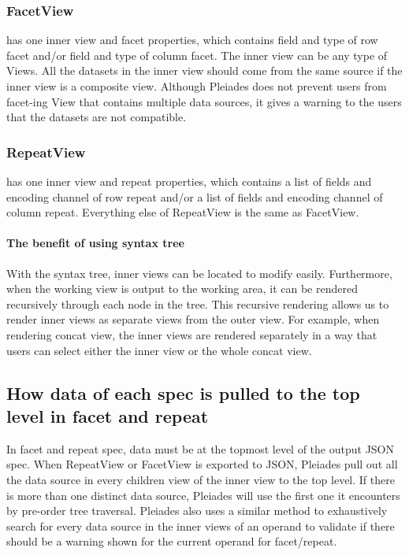 \documentclass[journal]{vgtc}                %
\begin{document}
\subsubsection{FacetView} has one inner view and facet properties, which contains
field and type of row facet and/or field and type of column facet. The inner
view can be any type of Views. All the datasets in the inner view should come
from the same source if the inner view is a composite view. Although Pleiades
does not prevent users from facet-ing View that contains multiple data sources,
it gives a warning to the users that the datasets are not compatible.

\subsubsection{RepeatView} has one inner view and repeat properties, which contains
a list of fields and encoding channel of row repeat and/or a list of fields and
encoding channel of column repeat. Everything else of RepeatView is the same as
FacetView.

\paragraph{The benefit of using syntax tree} With the syntax tree, inner views
can be located to modify easily. Furthermore, when the working view is output to
the working area, it can be rendered recursively through each node in the tree.
This recursive rendering allows us to render inner views as separate views from
the outer view. For example, when rendering concat view, the inner views are
rendered separately in a way that users can select either the inner view or
the whole concat view.

\subsection{How data of each spec is pulled to the top level in facet and repeat}
In facet and repeat spec, data must be at the topmost level of the output JSON
spec. When RepeatView or FacetView is exported to JSON, Pleiades pull out all
the data source in every children view of the inner view to the top level. If
there is more than one distinct data source, Pleiades will use the first one it
encounters by pre-order tree traversal. Pleiades also uses a similar method to
exhaustively search for every data source in the inner views of an operand to
validate if there should be a warning shown for the current operand for facet/repeat.
\end{document}
